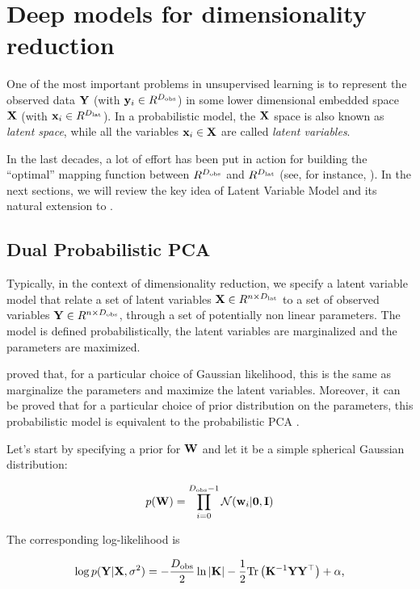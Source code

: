 
\section{Deep models for dimensionality reduction}
One of the most important problems in unsupervised learning is to represent the observed data $\mathbf{Y}$ (with $\mathbf{y}_i \in R^{D_\mathrm{obs}}$) in some lower dimensional embedded space $\mathbf{X}$ (with $\mathbf{x}_i \in R^{D_\mathrm{lat}}$). In a probabilistic model, the $\mathbf{X}$ space is also known as \emph{latent space}, while all the variables $\mathbf{x}_i \in \mathbf{X}$ are called \emph{latent variables}.

In the last decades, a lot of effort has been put in action for building the ``optimal'' mapping function between $R^{D_\mathrm{obs}}$ and $R^{D_\mathrm{lat}}$ (see, for instance, ). In the next sections, we will review the key idea of Latent Variable Model and its natural extension to \gplvm.

\subsection{Dual Probabilistic PCA}
Typically, in the context of dimensionality reduction, we specify a latent variable model that relate a set of latent variables $\mathbf{X} \in R^{n\times D_\mathrm{lat}}$ to a set of observed variables $\mathbf{Y} \in R^{n\times D_\mathrm{obs}}$, through a set of potentially non linear parameters. The model is defined probabilistically, the latent variables are marginalized and the parameters are maximized.

\citet{Lawrence2005} proved that, for a particular choice of Gaussian likelihood, this is the same as marginalize the parameters and maximize the latent variables. Moreover, it can be proved that for a particular choice of prior distribution on the parameters, this probabilistic model is equivalent to the probabilistic PCA \citep{Bishop1999}.

Let's start by specifying a prior for $\mathbf{W}$ and let it be a simple spherical Gaussian distribution:

\begin{equation}
    p(\mathbf{W}) = \prod_{i=0}^{D_\mathrm{obs}-1}\mathcal{N}(\mathbf{w}_i\vert\mathbf{0}, \mathbf{I})
\end{equation}

The corresponding log-likelihood is

\begin{equation}
    \label{eq:likelihood:lvm:lawrence}
    \log p(\mathbf{Y}\vert\mathbf{X},\sigma^2) =  - \dfrac{D_\mathrm{obs}}{2}\ln\vert\mathbf{K}\vert - \dfrac{1}{2}\mathrm{Tr}\left(\mathbf{K}^{-1}\mathbf{Y}\mathbf{Y}^\top\right) + \alpha\text{,}
\end{equation}

